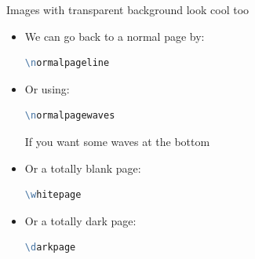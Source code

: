 \documentclass[aspectratio=169,11pt]{beamer}
\makeatletter
\let\zeropad\@anim@pad
\makeatother
\begin{document}
\darkpageline
\begin{frame}{\insertsection}
    Images with transparent background look cool too
    \begin{animateinline}[poster=last,autoplay,autopause,loop]{15}
    }
    \end{animateinline}
\end{frame}



\normalpageline
\begin{frame}[fragile]{\insertsection}
    \begin{itemize}
        \item We can go back to a normal page by: 
        \begin{lstlisting}[language=tcl,numbers=none]
\normalpageline\end{lstlisting}
    \end{itemize}
\end{frame}



\normalpagewaves
\begin{frame}[fragile]{\insertsection}
    \begin{itemize}
        \item Or using:
        \begin{lstlisting}[language=tcl,numbers=none]
\normalpagewaves\end{lstlisting}
        If you want some waves at the bottom 
    \end{itemize}
\end{frame}



\whitepage
\begin{frame}[fragile]{\insertsection}
    \begin{itemize}
        \item Or a totally blank page:
        \begin{lstlisting}[language=tcl,numbers=none]
\whitepage\end{lstlisting}
    \end{itemize}
\end{frame}

\darkpage
\begin{frame}[fragile]{\insertsection}
    \begin{itemize}
        \item Or a totally dark page:
        \begin{lstlisting}[language=tcl,numbers=none]
\darkpage\end{lstlisting}
    \end{itemize}
\end{frame}
\end{document}
